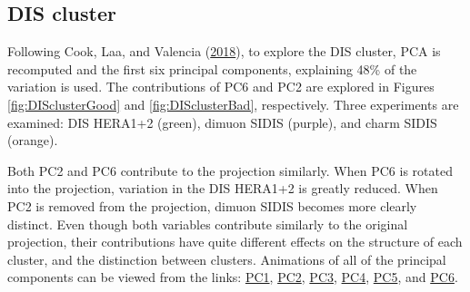 \hypertarget{dis-cluster}{%
\subsection{DIS cluster}\label{dis-cluster}}

Following Cook, Laa, and Valencia
(\protect\hyperlink{ref-cook_dynamical_2018}{2018}), to explore the DIS
cluster, PCA is recomputed and the first six principal components,
explaining 48\% of the variation is used. The contributions of PC6 and
PC2 are explored in Figures \ref{fig:DISclusterGood} and
\ref{fig:DISclusterBad}, respectively. Three experiments are examined:
DIS HERA1+2 (green), dimuon SIDIS (purple), and charm SIDIS (orange).

Both PC2 and PC6 contribute to the projection similarly. When PC6 is
rotated into the projection, variation in the DIS HERA1+2 is greatly
reduced. When PC2 is removed from the projection, dimuon SIDIS becomes
more clearly distinct. Even though both variables contribute similarly
to the original projection, their contributions have quite different
effects on the structure of each cluster, and the distinction between
clusters. Animations of all of the principal components can be viewed
from the links:
\href{https://nspyrison.netlify.com/thesis/discluster_manualtour_pc1/}{PC1},
\href{https://nspyrison.netlify.com/thesis/discluster_manualtour_pc2/}{PC2},
\href{https://nspyrison.netlify.com/thesis/discluster_manualtour_pc3/}{PC3},
\href{https://nspyrison.netlify.com/thesis/discluster_manualtour_pc4/}{PC4},
\href{https://nspyrison.netlify.com/thesis/discluster_manualtour_pc5/}{PC5},
and
\href{https://nspyrison.netlify.com/thesis/discluster_manualtour_pc6/}{PC6}.

